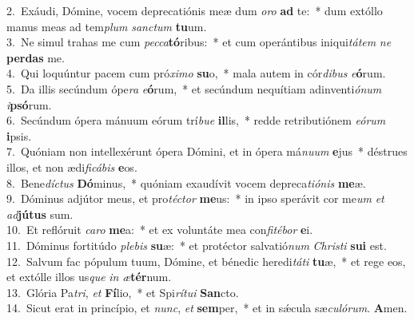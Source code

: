 {2.~}Exáudi, Dómine, vocem deprecatiónis meæ dum \textit{o}\textit{ro} \textbf{ad} te:~* dum extóllo manus meas ad tem\textit{plum} \textit{san}\textit{ctum} \textbf{tu}um.\\
{3.~}Ne simul trahas me cum \textit{pec}\textit{ca}\textbf{tó}ribus:~* et cum operántibus iniqui\textit{tá}\textit{tem} \textit{ne} \textbf{per}\textbf{das} me.\\
{4.~}Qui loquúntur pacem cum pró\textit{xi}\textit{mo} \textbf{su}o,~* mala autem in cór\textit{di}\textit{bus} \textit{e}\textbf{ó}rum.\\
{5.~}Da illis secúndum ópe\textit{ra} \textit{e}\textbf{ó}rum,~* et secúndum nequítiam adinventi\textit{ó}\textit{num} \textit{i}\textbf{psó}rum.\\
{6.~}Secúndum ópera mánuum eórum trí\textit{bu}\textit{e} \textbf{il}lis,~* redde retributiónem \textit{e}\textit{ó}\textit{rum} \textbf{i}psis.\\
{7.~}Quóniam non intellexérunt ópera Dómini, et in ópera má\textit{nu}\textit{um} \textbf{e}jus~* déstrues illos, et non ædi\textit{fi}\textit{cá}\textit{bis} \textbf{e}os.\\
{8.~}Bene\textit{dí}\textit{ctus} \textbf{Dó}minus,~* quóniam exaudívit vocem depreca\textit{ti}\textit{ó}\textit{nis} \textbf{me}æ.\\
{9.~}Dóminus adjútor meus, et pro\textit{té}\textit{ctor} \textbf{me}us:~* in ipso sperávit cor me\textit{um} \textit{et} \textit{ad}\textbf{jú}\textbf{tus} sum.\\
{10.~}Et reflóruit \textit{ca}\textit{ro} \textbf{me}a:~* et ex voluntáte mea con\textit{fi}\textit{té}\textit{bor} \textbf{e}i.\\
{11.~}Dóminus fortitúdo \textit{ple}\textit{bis} \textbf{su}æ:~* et protéctor salvatió\textit{num} \textit{Chri}\textit{sti} \textbf{su}\textbf{i} est.\\
{12.~}Salvum fac pópulum tuum, Dómine, et bénedic heredi\textit{tá}\textit{ti} \textbf{tu}æ,~* et rege eos, et extólle illos us\textit{que} \textit{in} \textit{æ}\textbf{tér}num.\\
{13.~}Glória Pa\textit{tri}, \textit{et} \textbf{Fí}lio,~* et Spi\textit{rí}\textit{tu}\textit{i} \textbf{San}cto.\\
{14.~}Sicut erat in princípio, et \textit{nunc}, \textit{et} \textbf{sem}per,~* et in sǽcula sæ\textit{cu}\textit{ló}\textit{rum}. \textbf{A}men.\\
